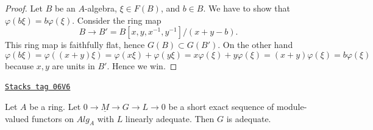 \begin{proof}
Let $B$ be an $A$-algebra, $\xi \in F(B)$, and $b \in B$. We have to show
that $\varphi(b \xi) = b \varphi(\xi)$. Consider the ring map
$$
B \to B' = B[x, y, x^{-1}, y^{-1}]/(x + y - b).
$$
This ring map is faithfully flat, hence $G(B) \subset G(B')$. On the
other hand
$$
\varphi(b\xi) = \varphi((x + y)\xi) =
\varphi(x\xi) + \varphi(y\xi) = x\varphi(\xi) + y\varphi(\xi)
= (x + y)\varphi(\xi) = b\varphi(\xi)
$$
because $x, y$ are units in $B'$. Hence we win.
\end{proof}

\begin{lemma}
\label{adequate-lemma-extension-adequate-key}
\href{https://stacks.math.columbia.edu/tag/06V6}{\texttt{Stacks tag 06V6}}

Let $A$ be a ring.
Let $0 \to \underline{M} \to G \to L \to 0$ be a short exact sequence
of module-valued functors on $\textit{Alg}_A$ with $L$ linearly adequate.
Then $G$ is adequate.
\end{lemma}


